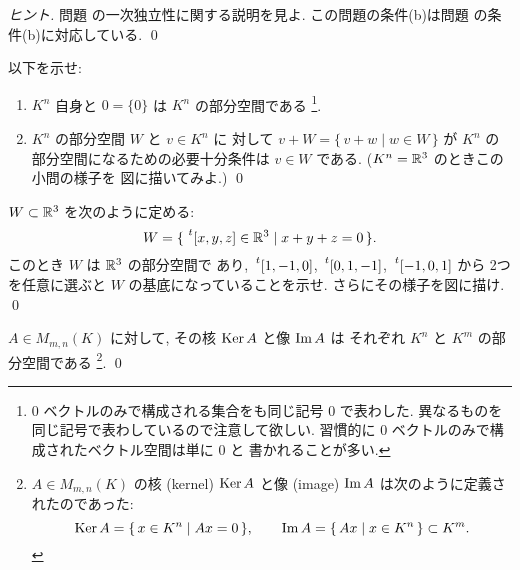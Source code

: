 \documentclass[12pt,twoside]{jarticle}
\begin{document}
\begin{proof}[ヒント]
  問題  の一次独立性に関する説明を見よ. 
  この問題の条件(b)は問題  の条件(b)に対応している.
  \qed
\end{proof}


\begin{question}
  以下を示せ:
  \begin{enumerate}
  \item $K^n$ 自身と $0=\{0\}$ は $K^n$ の部分空間である%
    \footnote{$0$ ベクトルのみで構成される集合をも同じ記号 $0$ で表わした.
      異なるものを同じ記号で表わしているので注意して欲しい.
      習慣的に $0$ ベクトルのみで構成されたベクトル空間は単に $0$ と
      書かれることが多い.}.
  \item $K^n$ の部分空間 $W$ と $v\in K^n$ に
    対して $v+W=\{\,v+w\mid w\in W\,\}$ が $K^n$ の
    部分空間になるための必要十分条件は $v\in W$ である.
    ($K^n={\mathbb R}^3$ のときこの小問の様子を 図に描いてみよ.)
    \qed
  \end{enumerate}
\end{question}


\begin{question}
  $W\subset {\mathbb R}^3$ を次のように定める:
  \begin{equation*}
    W = \{\, \tp{[x,y,z]}\in \R^3 \mid x + y + z = 0 \,\}.
  \end{equation*}
  このとき $W$ は ${\mathbb R}^3$ の部分空間で
  あり,  $\tp{[1,-1,0]}$, $\tp{[0,1,-1]}$, $\tp{[-1,0,1]}$ から
  2つを任意に選ぶと $W$ の基底になっていることを示せ.
  さらにその様子を図に描け.
  \qed
\end{question}


\begin{question}
  $A\in M_{m,n}(K)$ に対して, その核 $\mathop{\mathrm{Ker}}\nolimits A$ と像 $\mathop{\mathrm{Im}}\nolimits A$ は
  それぞれ $K^n$ と $K^m$ の部分空間である%
  \footnote{$A\in M_{m,n}(K)$ の核 (kernel) $\mathop{\mathrm{Ker}}\nolimits A$ と像 (image) $\mathop{\mathrm{Im}}\nolimits A$ 
    は次のように定義されたのであった:
    \begin{equation*}
      \mathop{\mathrm{Ker}}\nolimits A = \{\, x\in K^n \mid Ax = 0 \,\},
      \qquad
      \mathop{\mathrm{Im}}\nolimits A = \{\, Ax \mid x \in K^n \,\} \subset K^m.
    \end{equation*}}.
  \qed
\end{question}
\end{document}
